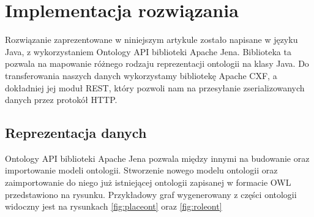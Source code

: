 \section{Implementacja rozwiązania}
\label{cha:impl}

Rozwiązanie zaprezentowane w niniejszym artykule zostało napisane w języku Java, z wykorzystaniem Ontology API biblioteki Apache Jena. Biblioteka ta pozwala na mapowanie różnego rodzaju reprezentacji ontologii na klasy Java. Do transferowania naszych danych wykorzystamy bibliotekę Apache CXF, a dokładniej jej moduł REST, który pozwoli nam na przesyłanie zserializowanych danych przez protokół HTTP.

\subsection{Reprezentacja danych}
\label{sec:persist}

Ontology API biblioteki Apache Jena pozwala między innymi na budowanie oraz importowanie modeli ontologii. Stworzenie nowego modelu ontologii oraz zaimportowanie do niego już istniejącej ontologii zapisanej w formacie OWL przedstawiono na rysunku. Przykładowy graf wygenerowany z części ontologii widoczny jest na rysunkach \ref{fig:placeont} oraz \ref{fig:roleont}

